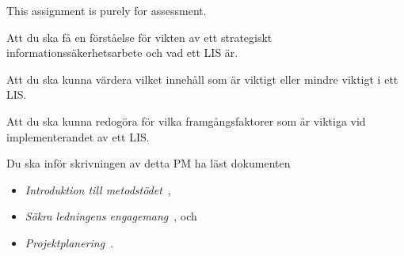This assignment is purely for assessment.

\item Att du ska få en förståelse för vikten av ett strategiskt 
  infor\-mations\-säker\-hets\-ar\-be\-te och vad ett LIS är.
\item Att du ska kunna värdera vilket innehåll som är viktigt eller mindre 
viktigt i ett LIS\@.
\item Att du ska kunna redogöra för vilka framgångsfaktorer som är viktiga vid 
implementerandet av ett LIS\@.

Du ska inför skrivningen av detta PM ha läst dokumenten
\begin{itemize}
  \item \emph{Introduktion till metodstödet}~\cite{MSB2011itm},
  \item \emph{Säkra ledningens engagemang}~\cite{MSB2011sle}, och
  \item \emph{Projektplanering}~\cite{MSB2011p}.
\end{itemize}


